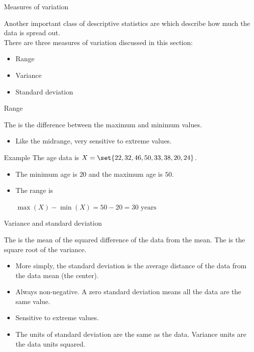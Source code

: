 \documentclass[xcolor=table, aspectratio=169, bigger]{beamer}
\begin{document}
\begin{frame}{Measures of variation}
\begin{block}{}
Another important class of descriptive statistics are  which describe how much the data is spread out.\\
\medskip
There are three measures of variation discussed in this section:
\begin{itemize}
\item Range
\item Variance
\item Standard deviation
\end{itemize}

\end{block}
\end{frame}

\begin{frame}{Range}
\begin{block}{}
The  is the difference between the maximum and minimum values.
\begin{itemize}
\item Like the midrange, very sensitive to extreme values.
\end{itemize}
\end{block}

\pause
\begin{exampleblock}{Example}
The age data is $X = \set{22, 32, 46, 50, 33, 38, 20, 24}$.
\begin{itemize}
\item The minimum age is $20$ and the maximum age is $50$.
\pause
\item The range is \\
\smallskip
{\centering
$\max(X) - \min(X) = 50 - 20 = 30 \text{ years}$
\par}
\end{itemize}
\smallskip
\end{exampleblock}

\end{frame}

\begin{frame}{Variance and standard deviation}
\begin{block}{}
The  is the mean of the squared difference of the data from the mean. The  is the square root of the variance.
\begin{itemize}
\pause\item More simply, the standard deviation is the average distance of the data from the data mean (the center).
\pause\item Always non-negative. A zero standard deviation means all the data are the same value.
\pause\item Sensitive to extreme values.
\pause\item The units of standard deviation are the same as the data. Variance units are the data units squared.
\end{itemize}
\end{block}
\end{frame}
\end{document}
